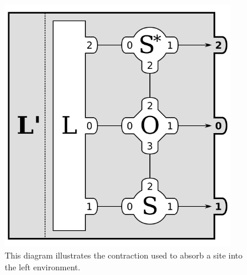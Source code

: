 \documentclass{article}
\newcommand{\diagramwidth}{4in}
\begin{document}
\begin{figure}\begin{center}
\includegraphics[width=\diagramwidth]{drawings/contractSOSLeft-car}
\caption{\label{fig:contractSOSLeft-car} This diagram illustrates the contraction used to absorb a site into the left environment.}
\end{center}\end{figure}
\end{document}
